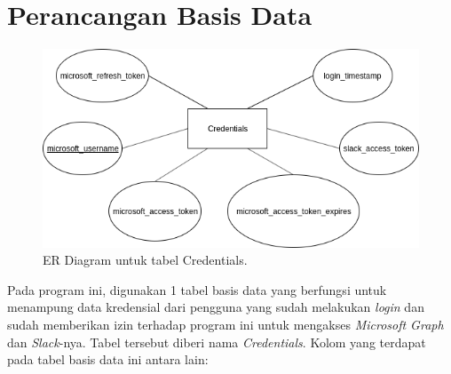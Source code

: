 \section{Perancangan Basis Data}
\begin{figure}[h]
  \includegraphics[width=15cm]{./Gambar/ERD.png}
  \centering
  \caption{ER Diagram untuk tabel Credentials.}
  \label{fig:erd}
\end{figure}
Pada program ini, digunakan 1 tabel basis data yang berfungsi untuk menampung data kredensial dari pengguna yang sudah melakukan \textit{login} dan sudah memberikan izin terhadap program ini untuk mengakses \textit{Microsoft Graph} dan \textit{Slack}-nya. Tabel tersebut diberi nama \textit{Credentials}. Kolom yang terdapat pada tabel basis data ini antara lain:
